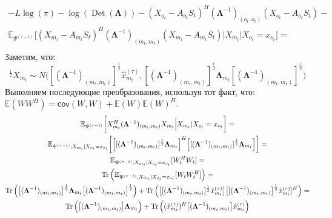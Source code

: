 \documentclass[11pt]{article}
\newcommand{\Expect}{\mathbb{E}}
\newcommand{\Cov}{\mathsf{cov}}
\DeclareMathOperator{\Det}{Det}
\begin{document}
\begin{equation*}
\begin{gathered}
-L \log(\pi) - \log (\Det(\mathbf{\Lambda}))  - (X_{o_t} - A_{o_t}S_t)^H (\mathbf{\Lambda}^{-1})_{(o_t, o_t)} (X_{o_t} - A_{o_t}S_t) - \\ \Expect_{\Psi^{(\tau-1)}} \bigg[ (X_{m_t} - A_{m_t}S_t)^H (\mathbf{\Lambda}^{-1})_{(m_t, m_t)} (X_{m_t} - A_{m_t}S_t) 
\Big|X_{m_t}|X_{o_t}=x_{o_t}\bigg] = \\
\end{gathered}
\end{equation*}
Заметим, что: 
\begin{equation*}
[(\mathbf{\Lambda}^{-1})_{(m_t, m_t)}]^{\frac{1}{2}}X_{m_t} \sim N\Big([(\mathbf{\Lambda}^{-1})_{(m_t, m_t)}]^{\frac{1}{2}}\hat{x}_{m_t}^{(\tau)},[(\mathbf{\Lambda}^{-1})_{(m_t, m_t)}]^{\frac{1}{2}}\mathbf{\Lambda}_{m_t}[(\mathbf{\Lambda}^{-1})_{(m_t, m_t)}]^{\frac{1}{2}}\Big)
\end{equation*}
Выполняем последующие преобразования, используя тот факт, что: $\Expect(WW^H)=\Cov(W,W)+\Expect(W)\Expect(W)^H$.
\begin{equation*}
\begin{gathered}
\Expect_{\Psi^{(\tau-1)}}\bigg[X_{m_t}^H (\mathbf{\Lambda}^{-1})_{(m_t, m_t)}X_{m_t}   \Big|X_{m_t}|X_{o_t}=x_{o_t}\bigg] = \\
\Expect_{\Psi^{(\tau-1)},X_{m_t}|X_{o_t}=x_{o_t}}\bigg[\Big[[(\mathbf{\Lambda}^{-1})_{(m_t, m_t)}]^{\frac{1}{2}}\mathbf{\Lambda}_{m_t}\Big]^H\Big[[(\mathbf{\Lambda}^{-1})_{(m_t, m_t)}]^{\frac{1}{2}}\mathbf{\Lambda}_{m_t}\Big]\bigg] = \\
\Expect_{\Psi^{(\tau-1)},X_{m_t}|X_{o_t}=x_{o_t}}[W_t^HW_t] = \\
\Tr \Big( \Expect_{\Psi^{(\tau-1)},X_{m_t}|X_{o_t}=x_{o_t}}[W_tW_t^H] \Big) = \\
\Tr \Big( \big[(\mathbf{\Lambda}^{-1})_{(m_t, m_t)}\big]^{\frac{1}{2}}\mathbf{\Lambda}_{m_t}\big[(\mathbf{\Lambda}^{-1})_{(m_t, m_t)}\big]^{\frac{1}{2}} \Big) +  \Tr \Big( \big[[(\mathbf{\Lambda}^{-1})_{(m_t, m_t)}]^{\frac{1}{2}}\hat{x}_{m_t}^{(\tau)}\big]\big[[(\mathbf{\Lambda}^{-1})_{(m_t, m_t)}\big]^{\frac{1}{2}}\hat{x}_{m_t}^{(\tau)}]^H \Big)= \\
\Tr \Big( \big[(\mathbf{\Lambda}^{-1})_{(m_t, m_t)}\big]\mathbf{\Lambda}_{m_t} \Big) + \Tr \Big((\hat{x}_{m_t}^{(\tau)})^H\big[(\mathbf{\Lambda}^{-1})_{(m_t, m_t)}\big]\hat{x}_{m_t}^{(\tau)} \Big) \\
\end{gathered}
\end{equation*}
\end{document}

